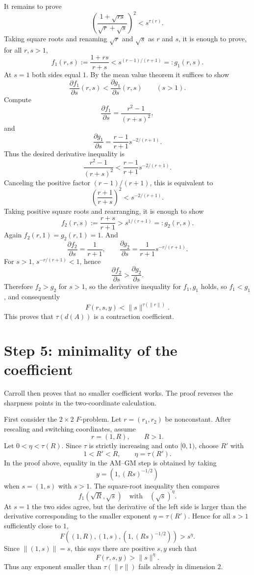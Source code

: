 It remains to prove
\[
  \left(\frac{1+\sqrt{rs}}{\sqrt r+\sqrt s}\right)^2
  < s^{\tau(r)}.
\]
Taking square roots and renaming $\sqrt r$ and $\sqrt s$ as $r$ and $s$, it is enough
to prove, for all $r,s>1$,
\[
  f_1(r,s):=\frac{1+rs}{r+s}
  < s^{(r-1)/(r+1)}=:g_1(r,s).
\]
At $s=1$ both sides equal $1$.  By the mean value theorem it suffices to show
\[
  \frac{\partial f_1}{\partial s}(r,s)
  <
  \frac{\partial g_1}{\partial s}(r,s)
  \qquad(s>1).
\]
Compute
\[
  \frac{\partial f_1}{\partial s}
  =\frac{r^2-1}{(r+s)^2},
\]
and
\[
  \frac{\partial g_1}{\partial s}
  =\frac{r-1}{r+1}s^{-2/(r+1)}.
\]
Thus the desired derivative inequality is
\[
  \frac{r^2-1}{(r+s)^2}
  <\frac{r-1}{r+1}s^{-2/(r+1)}.
\]
Canceling the positive factor $(r-1)/(r+1)$, this is equivalent to
\[
  \left(\frac{r+1}{r+s}\right)^2<s^{-2/(r+1)}.
\]
Taking positive square roots and rearranging, it is enough to show
\[
  f_2(r,s):=\frac{r+s}{r+1}>s^{1/(r+1)}=:g_2(r,s).
\]
Again $f_2(r,1)=g_2(r,1)=1$.  And
\[
  \frac{\partial f_2}{\partial s}=\frac{1}{r+1},
  \qquad
  \frac{\partial g_2}{\partial s}=\frac{1}{r+1}s^{-r/(r+1)}.
\]
For $s>1$, $s^{-r/(r+1)}<1$, hence
\[
  \frac{\partial f_2}{\partial s}>
  \frac{\partial g_2}{\partial s}.
\]
Therefore $f_2>g_2$ for $s>1$, so the derivative inequality for $f_1,g_1$ holds,
so $f_1<g_1$, and consequently
\[
  F(r,s,y)<\|s\|^{\tau(\|r\|)}.
\]
This proves that $\tau(d(A))$ is a contraction coefficient.

\section*{Step 5: minimality of the coefficient}
Carroll then proves that no smaller coefficient works.  The proof reverses the
sharpness points in the two-coordinate calculation.

First consider the $2\times2$ $F$-problem.  Let $r=(r_1,r_2)$ be nonconstant.  After
rescaling and switching coordinates, assume
\[
  r=(1,R),\qquad R>1.
\]
Let $0<\eta<\tau(R)$.  Since $\tau$ is strictly increasing and onto $[0,1)$, choose
$R'$ with
\[
  1<R'<R,
  \qquad
  \eta=\tau(R').
\]
In the proof above, equality in the AM--GM step is obtained by taking
\[
  y=(1,(Rs)^{-1/2})
\]
when $s=(1,s)$ with $s>1$.  The square-root inequality then compares
\[
  f_1(\sqrt R,\sqrt s)
  \quad\text{with}\quad
  (\sqrt s)^\eta.
\]
At $s=1$ the two sides agree, but the derivative of the left side is larger than the
derivative corresponding to the smaller exponent $\eta=\tau(R')$.  Hence for all
$s>1$ sufficiently close to $1$,
\[
  F\left((1,R),(1,s),(1,(Rs)^{-1/2})\right)>s^\eta.
\]
Since $\|(1,s)\|=s$, this says there are positive $s,y$ such that
\[
  F(r,s,y)>\|s\|^\eta.
\]
Thus any exponent smaller than $\tau(\|r\|)$ fails already in dimension $2$.

